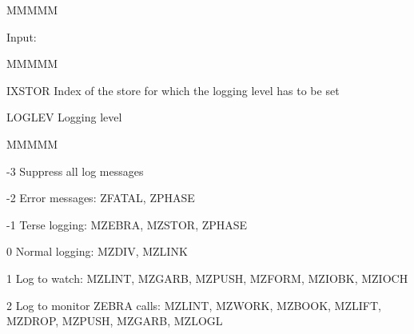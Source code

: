 \begin{DL}{MMMMM}
\item[Input:
]
\begin{DL}{MMMMM}
\item[IXSTOR
]Index of the store
for which the logging level has to be set
\item[LOGLEV
]Logging level
\begin{DL}{MMMMM}
\item[-3
]Suppress all log messages
\item[-2
]Error messages: ZFATAL, ZPHASE
\item[-1
]Terse logging: MZEBRA, MZSTOR, ZPHASE
\item[ 0
]Normal logging: MZDIV, MZLINK
\item[ 1
]Log to watch: MZLINT, MZGARB, MZPUSH, MZFORM, MZIOBK, MZIOCH
\item[ 2
]Log to monitor ZEBRA calls: MZLINT,
MZWORK, MZBOOK, MZLIFT, MZDROP, MZPUSH, MZGARB, MZLOGL
\end{DL}
\end{DL}
\end{DL}
